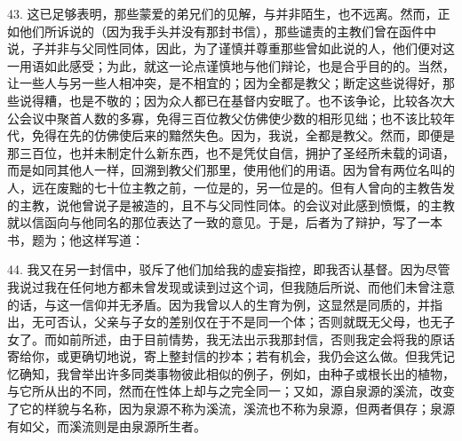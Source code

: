 43. 这已足够表明，那些蒙爱的弟兄们的见解，与并非陌生，也不远离。然而，正如他们所诉说的（因为我手头并没有那封书信），那些谴责的主教们曾在函件中说，子并非与父同性同体，因此，为了谨慎并尊重那些曾如此说的人，他们便对这一用语如此感受；为此，就这一论点谨慎地与他们辩论，也是合乎目的的。当然，让一些人与另一些人相冲突，是不相宜的；因为全都是教父；断定这些说得好，那些说得糟，也是不敬的；因为众人都已在基督内安眠了。也不该争论，比较各次大公会议中聚首人数的多寡，免得三百位教父仿佛使少数的相形见绌；也不该比较年代，免得在先的仿佛使后来的黯然失色。因为，我说，全都是教父。然而，即便是那三百位，也并未制定什么新东西，也不是凭仗自信，拥护了圣经所未载的词语，而是如同其他人一样，回溯到教父们那里，使用他们的用语。因为曾有两位名叫的人，远在废黜的七十位主教之前，一位是的，另一位是的。但有人曾向的主教告发的主教，说他曾说子是被造的，且不与父同性同体。的会议对此感到愤慨，的主教就以信函向与他同名的那位表达了一致的意见。于是，后者为了辩护，写了一本书，题为；他这样写道：\par

44. 我又在另一封信中，驳斥了他们加给我的虚妄指控，即我否认基督。因为尽管我说过我在任何地方都未曾发现或读到过这个词，但我随后所说、而他们未曾注意的话，与这一信仰并无矛盾。因为我曾以人的生育为例，这显然是同质的，并指出，无可否认，父亲与子女的差别仅在于不是同一个体；否则就既无父母，也无子女了。而如前所述，由于目前情势，我无法出示我那封信，否则我定会将我的原话寄给你，或更确切地说，寄上整封信的抄本；若有机会，我仍会这么做。但我凭记忆确知，我曾举出许多同类事物彼此相似的例子，例如，由种子或根长出的植物，与它所从出的不同，然而在性体上却与之完全同一；又如，源自泉源的溪流，改变了它的样貌与名称，因为泉源不称为溪流，溪流也不称为泉源，但两者俱存；泉源有如父，而溪流则是由泉源所生者。\par

